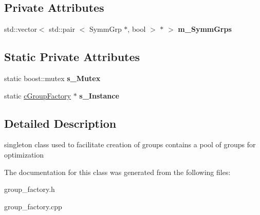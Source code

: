 \subsection*{\-Private \-Attributes}
\begin{DoxyCompactItemize}
\item 
\hypertarget{classcGroupFactory_a971617f9dd69295a27aede82781d3a8e}{std\-::vector$<$ std\-::pair\*
$<$ \-Symm\-Grp $\ast$, bool $>$ $\ast$ $>$ {\bfseries m\-\_\-\-Symm\-Grps}}\label{classcGroupFactory_a971617f9dd69295a27aede82781d3a8e}

\end{DoxyCompactItemize}
\subsection*{\-Static \-Private \-Attributes}
\begin{DoxyCompactItemize}
\item 
\hypertarget{classcGroupFactory_abc9e8708326d158987ac8665b672be25}{static boost\-::mutex {\bfseries s\-\_\-\-Mutex}}\label{classcGroupFactory_abc9e8708326d158987ac8665b672be25}

\item 
\hypertarget{classcGroupFactory_aee9b5a04dd76633ef13aa16caa9ad310}{static \hyperlink{classcGroupFactory}{c\-Group\-Factory} $\ast$ {\bfseries s\-\_\-\-Instance}}\label{classcGroupFactory_aee9b5a04dd76633ef13aa16caa9ad310}

\end{DoxyCompactItemize}


\subsection{\-Detailed \-Description}
singleton class used to facilitate creation of groups contains a pool of groups for optimization 

\-The documentation for this class was generated from the following files\-:\begin{DoxyCompactItemize}
\item 
group\-\_\-factory.\-h\item 
group\-\_\-factory.\-cpp\end{DoxyCompactItemize}
